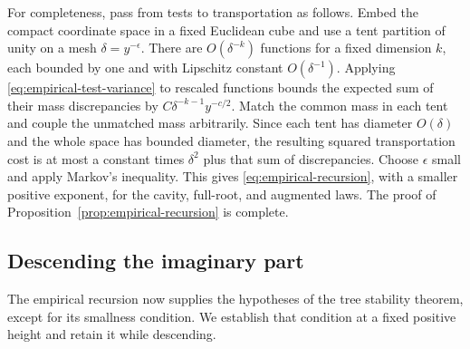 For completeness, pass from tests to transportation as follows.
Embed the compact coordinate space in a fixed Euclidean cube and
use a tent partition of unity on a mesh $\delta=y^{-\epsilon}$.
There are $O(\delta^{-k})$ functions for a fixed dimension $k$, each
bounded by one and with Lipschitz constant $O(\delta^{-1})$.
Applying \eqref{eq:empirical-test-variance} to rescaled functions
bounds the expected sum of their mass discrepancies by
$C\delta^{-k-1}y^{-c/2}$.  Match the common mass in each tent and
couple the unmatched mass arbitrarily.  Since each tent has diameter
$O(\delta)$ and the whole space has bounded diameter, the resulting
squared transportation cost is at most a constant times $\delta^2$
plus that sum of discrepancies.  Choose $\epsilon$ small and apply
Markov's inequality.  This gives \eqref{eq:empirical-recursion}, with
a smaller positive exponent, for the cavity, full-root, and augmented
laws.  The proof of Proposition~\ref{prop:empirical-recursion} is complete.

\subsection{Descending the imaginary part}

The empirical recursion now supplies the hypotheses of the tree
stability theorem, except for its smallness condition.  We establish
that condition at a fixed positive height and retain it while descending.

